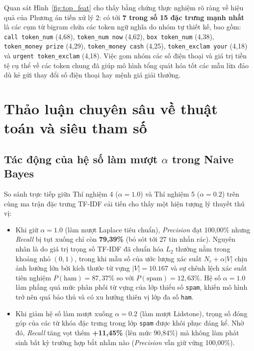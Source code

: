 \documentclass[12pt,a4paper]{report}
\begin{document}
Quan sát Hình~\ref{fig:top_feat} cho thấy bằng chứng thực nghiệm rõ ràng về hiệu quả của Phương án tiền xử lý 2: có tới \textbf{7 trong số 15 đặc trưng mạnh nhất} là các cụm từ bigram chứa các token ngữ nghĩa do nhóm tự thiết kế, bao gồm: \texttt{call token\_num} (4,68), \texttt{token\_num now} (4,62), \texttt{box token\_num} (4,38), \texttt{token\_money prize} (4,29), \texttt{token\_money cash} (4,25), \texttt{token\_exclam your} (4,18) và \texttt{urgent token\_exclam} (4,18). Việc gom nhóm các số điện thoại và giá trị tiền tệ cụ thể về các token chung đã giúp mô hình tổng quát hóa tốt các mẫu lừa đảo dù kẻ gửi thay đổi số điện thoại hay mệnh giá giải thưởng.

\section{Thảo luận chuyên sâu về thuật toán và siêu tham số}
\subsection{Tác động của hệ số làm mượt $\alpha$ trong Naive Bayes}
So sánh trực tiếp giữa Thí nghiệm 4 ($\alpha=1.0$) và Thí nghiệm 5 ($\alpha=0.2$) trên cùng ma trận đặc trưng TF-IDF cải tiến cho thấy một hiện tượng lý thuyết thú vị:
\begin{itemize}
    \item Khi giữ $\alpha=1.0$ (làm mượt Laplace tiêu chuẩn), \textit{Precision} đạt 100,00\% nhưng \textit{Recall} bị tụt xuống chỉ còn \textbf{79,39\%} (bỏ sót tới 27 tin nhắn rác). Nguyên nhân là do giá trị trọng số TF-IDF đã chuẩn hóa $L_2$ thường nằm trong khoảng nhỏ $(0, 1)$, trong khi mẫu số của ước lượng xác suất $N_c + \alpha |V|$ chịu ảnh hưởng lớn bởi kích thước từ vựng $|V| = 10.167$ và sự chênh lệch xác suất tiên nghiệm $P(\text{ham}) = 87,37\%$ so với $P(\text{spam}) = 12,63\%$. Hệ số $\alpha=1.0$ làm phẳng quá mức phân phối từ vựng của lớp thiểu số \texttt{spam}, khiến mô hình trở nên quá bảo thủ và có xu hướng thiên vị lớp đa số \texttt{ham}.
    \item Khi giảm hệ số làm mượt xuống $\alpha=0.2$ (làm mượt Lidstone), trọng số đóng góp của các từ khóa đặc trưng trong lớp \texttt{spam} được khôi phục đáng kể. Nhờ đó, \textit{Recall} tăng vọt thêm \textbf{+11,45\%} (lên mức 90,84\%) mà không làm phát sinh bất kỳ trường hợp bắt nhầm nào (\textit{Precision} vẫn giữ vững 100,00\%).
\end{itemize}
\end{document}
